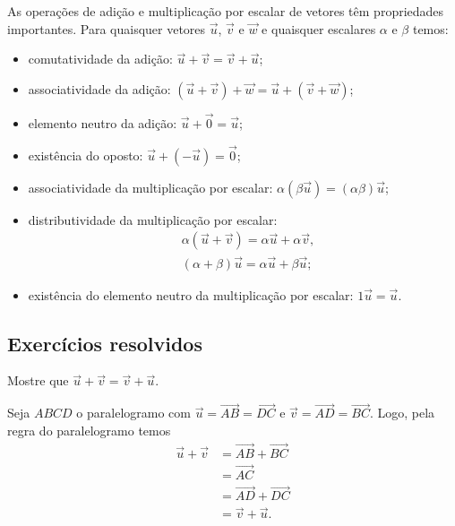 As operações de adição e multiplicação por escalar de vetores têm propriedades importantes. Para quaisquer vetores $\vec{u}$, $\vec{v}$ e $\vec{w}$ e quaisquer escalares $\alpha$ e $\beta$ temos:
\begin{itemize}
\item comutatividade da adição: $\vec{u}+\vec{v}=\vec{v}+\vec{u}$;
\item associatividade da adição: $(\vec{u} + \vec{v}) + \vec{w} = \vec{u} + (\vec{v} + \vec{w})$;
\item elemento neutro da adição: $\vec{u}+\vec{0}=\vec{u}$;
\item existência do oposto: $\vec{u}+(-\vec{u}) = \vec{0}$;
\item associatividade da multiplicação por escalar: $\alpha(\beta\vec{u})=(\alpha\beta)\vec{u}$;
\item distributividade da multiplicação por escalar:
  \begin{align}
    &\alpha(\vec{u}+\vec{v}) = \alpha\vec{u}+\alpha\vec{v},\\
    &(\alpha+\beta)\vec{u} = \alpha\vec{u}+\beta\vec{u};
  \end{align}
\item existência do elemento neutro da multiplicação por escalar: $1\vec{u}=\vec{u}$.
\end{itemize}

\subsection*{Exercícios resolvidos}

\begin{exeresol}\label{exeresol:vetor_comuta_adicao}
  Mostre que $\vec{u} + \vec{v} = \vec{v} + \vec{u}$.
\end{exeresol}
\begin{resol}
  Seja $ABCD$ o paralelogramo com $\vec{u} = \overrightarrow{AB} = \overrightarrow{DC}$ e $\vec{v} = \overrightarrow{AD} = \overrightarrow{BC}$. Logo, pela regra do paralelogramo temos
  \begin{align}
    \vec{u} + \vec{v} &= \overrightarrow{AB} + \overrightarrow{BC} \\
                      &= \overrightarrow{AC} \\
                      &= \overrightarrow{AD} + \overrightarrow{DC} \\
                      &= \vec{v} + \vec{u}.
  \end{align}
\end{resol}

